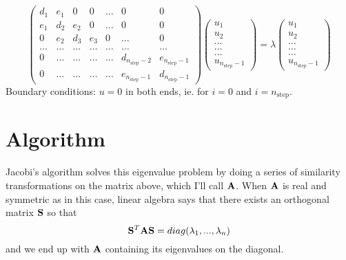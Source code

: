 \documentclass[a4paper,12pt, english]{article}
\begin{document}
\begin{equation}
    \left( \begin{array}{ccccccc} d_1 & e_1 & 0   & 0    & \dots  &0     & 0 \\
                                e_1 & d_2 & e_2 & 0    & \dots  &0     &0 \\
                                0   & e_2 & d_3 & e_3  &0       &\dots & 0\\
                                \dots  & \dots & \dots & \dots  &\dots      &\dots & \dots\\
                                0   & \dots & \dots & \dots  &\dots       &d_{n_{\mathrm{step}}-2} & e_{n_{\mathrm{step}}-1}\\
                                0   & \dots & \dots & \dots  &\dots       &e_{n_{\mathrm{step}}-1} & d_{n_{\mathrm{step}}-1}

             \end{array} \right)      \left( \begin{array}{c} u_{1} \\
                                                              u_{2} \\
                                                              \dots\\ \dots\\ \dots\\
                                                              u_{n_{\mathrm{step}}-1}
             \end{array} \right)=\lambda \left( \begin{array}{c} u_{1} \\
                                                              u_{2} \\
                                                              \dots\\ \dots\\ \dots\\
                                                              u_{n_{\mathrm{step}}-1}
             \end{array} \right) 
      \label{eq:sematrix}
\end{equation} 
Boundary conditions: $u = 0$ in both ends, ie. for $i = 0$ and $i = n_{\mathrm{step}}$.

\section*{Algorithm}
Jacobi's algorithm solves this eigenvalue problem by doing a series of similarity transformations
on the matrix above, which I'll call ${\bf A}$. When ${\bf A}$ is real and symmetric as in this
case, linear algebra says that there exists an orthogonal matrix ${\bf S}$ so that
\[
   {\bf S}^T {\bf A} {\bf S} = diag(\lambda_1, ... ,\lambda_n)
\]
and we end up with ${\bf A}$ containing its eigenvalues on the diagonal.
\end{document}
